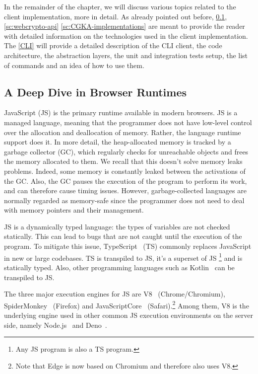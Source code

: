 In the remainder of the chapter, we will discuss various topics
related to the client implementation, more in detail.
As already pointed out before, \cref{sc:browser-runtimes}, \cref{sc:webcrypto-api} \cref{sc:CGKA-implementations}
are meant to provide the reader with detailed information 
on the technologies used in the client implementation.
The \cref{CLI} will provide a detailed description of the CLI client,
the code architecture, the abstraction layers, the unit and
integration tests setup, the list of commands and an idea of how
to use them.

\subsection{A Deep Dive in Browser Runtimes}\label{sc:browser-runtimes}

JavaScript (JS) is the primary runtime available in modern browsers.
JS is a managed language, meaning that the programmer
does not have low-level control over the allocation and
deallocation of memory. Rather, the language runtime support does it.
In more detail, the heap-allocated memory
is tracked by a garbage collector (GC), which regularly
checks for unreachable objects and frees the memory allocated
to them. We recall that this doesn't solve memory leaks
problems. Indeed, some memory is constantly leaked
between the activations of the GC. Also, the GC
pauses the execution of the program to perform its work,
and can therefore cause timing issues. However, garbage-collected
languages are normally regarded as memory-safe since
the programmer does not need to deal with memory pointers
and their management.


JS is a dynamically
typed language: the types of variables are not checked
statically. This can lead to bugs that are not caught
until the execution of the program.
To mitigate this issue, TypeScript~\cite{bierman2014understanding} (TS)
commonly replaces JavaScript in new or large codebases.
TS is transpiled to JS, it's a superset of JS
\footnote{Any JS program is also a TS program.}
and is statically typed.
Also, other programming languages such as
Kotlin~\cite{KotlinToJs} can be transpiled to JS.

The three major execution engines for JS are V8~\cite{V8} (Chrome/Chromium),
SpiderMonkey~\cite{SpiderMonkey} (Firefox) and JavaScriptCore~\cite{JavaScriptCore} (Safari).\footnote{Note that Edge is now based on Chromium and therefore
also uses V8.}
Among them, V8 is the underlying engine used in other
common JS execution environments on the server side, 
namely Node.js~\cite{NodeJS} and Deno~\cite{Deno}.


